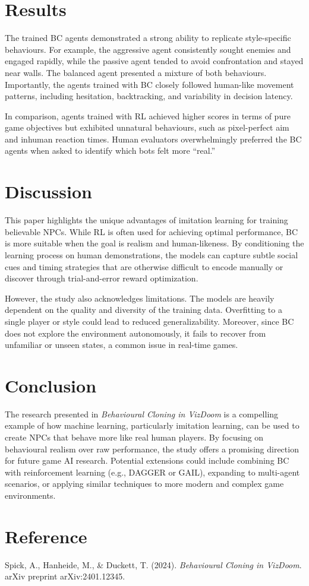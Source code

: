 \documentclass[12pt,a4paper]{article}
\begin{document}
\section*{Results}

The trained BC agents demonstrated a strong ability to replicate style-specific behaviours. For example, the aggressive agent consistently sought enemies and engaged rapidly, while the passive agent tended to avoid confrontation and stayed near walls. The balanced agent presented a mixture of both behaviours. Importantly, the agents trained with BC closely followed human-like movement patterns, including hesitation, backtracking, and variability in decision latency.

In comparison, agents trained with RL achieved higher scores in terms of pure game objectives but exhibited unnatural behaviours, such as pixel-perfect aim and inhuman reaction times. Human evaluators overwhelmingly preferred the BC agents when asked to identify which bots felt more “real.”

\section*{Discussion}

This paper highlights the unique advantages of imitation learning for training believable NPCs. While RL is often used for achieving optimal performance, BC is more suitable when the goal is realism and human-likeness. By conditioning the learning process on human demonstrations, the models can capture subtle social cues and timing strategies that are otherwise difficult to encode manually or discover through trial-and-error reward optimization.

However, the study also acknowledges limitations. The models are heavily dependent on the quality and diversity of the training data. Overfitting to a single player or style could lead to reduced generalizability. Moreover, since BC does not explore the environment autonomously, it fails to recover from unfamiliar or unseen states, a common issue in real-time games.

\section*{Conclusion}

The research presented in \textit{Behavioural Cloning in VizDoom} is a compelling example of how machine learning, particularly imitation learning, can be used to create NPCs that behave more like real human players. By focusing on behavioural realism over raw performance, the study offers a promising direction for future game AI research. Potential extensions could include combining BC with reinforcement learning (e.g., DAGGER or GAIL), expanding to multi-agent scenarios, or applying similar techniques to more modern and complex game environments.

\section*{Reference}

\noindent Spick, A., Hanheide, M., \& Duckett, T. (2024). \textit{Behavioural Cloning in VizDoom}. arXiv preprint arXiv:2401.12345.
\end{document}
